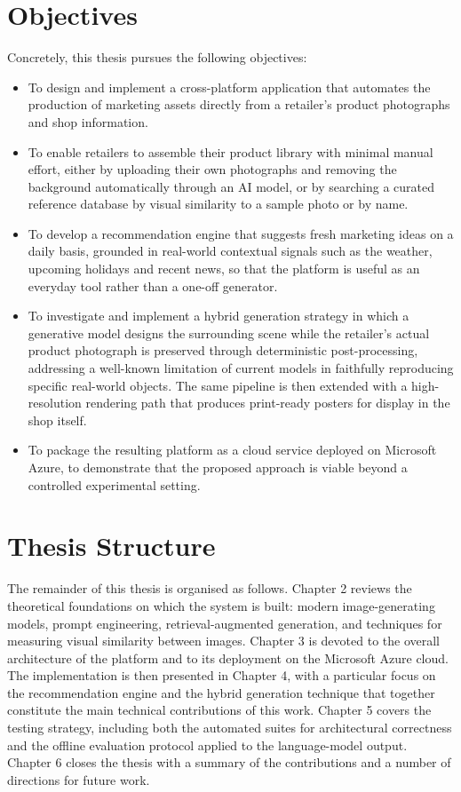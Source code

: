 \section{Objectives}
\label{sec:objectives}

Concretely, this thesis pursues the following objectives:

\begin{itemize}
    \item To design and implement a cross-platform application that automates the production of marketing assets directly from a retailer's product photographs and shop information.
    \item To enable retailers to assemble their product library with minimal manual effort, either by uploading their own photographs and removing the background automatically through an AI model, or by searching a curated reference database by visual similarity to a sample photo or by name.
    \item To develop a recommendation engine that suggests fresh marketing ideas on a daily basis, grounded in real-world contextual signals such as the weather, upcoming holidays and recent news, so that the platform is useful as an everyday tool rather than a one-off generator.
    \item To investigate and implement a hybrid generation strategy in which a generative model designs the surrounding scene while the retailer's actual product photograph is preserved through deterministic post-processing, addressing a well-known limitation of current models in faithfully reproducing specific real-world objects. The same pipeline is then extended with a high-resolution rendering path that produces print-ready posters for display in the shop itself.
    \item To package the resulting platform as a cloud service deployed on Microsoft Azure, to demonstrate that the proposed approach is viable beyond a controlled experimental setting.
\end{itemize}

\section{Thesis Structure}

The remainder of this thesis is organised as follows. Chapter 2 reviews the theoretical foundations on which the system is built: modern image-generating models, prompt engineering, retrieval-augmented generation, and techniques for measuring visual similarity between images. Chapter 3 is devoted to the overall architecture of the platform and to its deployment on the Microsoft Azure cloud. The implementation is then presented in Chapter 4, with a particular focus on the recommendation engine and the hybrid generation technique that together constitute the main technical contributions of this work. Chapter 5 covers the testing strategy, including both the automated suites for architectural correctness and the offline evaluation protocol applied to the language-model output. Chapter 6 closes the thesis with a summary of the contributions and a number of directions for future work.

